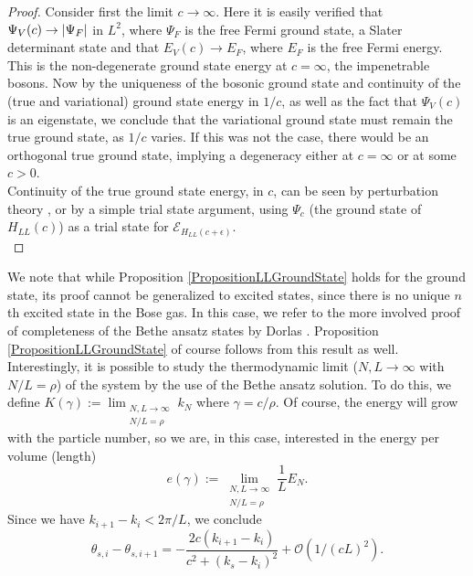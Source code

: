 \begin{proof}[Proof]
	Consider first the limit $ c\to \infty $. Here it is easily verified that $\Psi_V(c)\to \left\lvert \Psi_F \right\rvert$ in $ L^2 $, where $ \Psi_F $ is the free Fermi ground state, \ie a Slater determinant state and that $ E_V(c)\to E_F $, where $ E_F $ is the free Fermi energy. This is the non-degenerate ground state energy at $ c=\infty $, \ie the impenetrable bosons. Now by the uniqueness of the bosonic ground state and continuity of the (true and variational) ground state energy in $ 1/c $, as well as the fact that $ \Psi_V(c) $ is an eigenstate, we conclude that the variational ground state must remain the true ground state, as $ 1/c $ varies. If this was not the case, there would be an orthogonal true ground state, implying a degeneracy either at $ c=\infty $ or at some $ c>0 $. \\
	Continuity of the true ground state energy, in $ c $, can be seen by perturbation theory \cite{reed1978iv}, or by a simple trial state argument, using $ \Psi_c $ (the ground state of $ H_{LL}(c) $) as a trial state for $ \mathcal{E}_{H_{LL}(c+\epsilon)} $.\\
\end{proof}
We note that while Proposition \ref{PropositionLLGroundState} holds for the ground state, its proof cannot be generalized to excited states, since there is no unique $ n $th excited state in the Bose gas. In this case, we refer to the more involved proof of completeness of the Bethe ansatz states by Dorlas \cite{cmp/1104252974}. Proposition \ref{PropositionLLGroundState} of course follows from this result as well.\\
Interestingly, it is possible to study the thermodynamic limit ($ N,L\to\infty $ with $ N/L=\rho $) of the system by the use of the Bethe ansatz solution. To do this, we define $ K(\gamma):=\lim_{\substack{N,L\to\infty\\
		N/L=\rho}}k_N $ where $ \gamma=c/\rho $. Of course, the energy will grow with the particle number, so we are, in this case, interested in the energy per volume (length)
\begin{equation}\label{}
e(\gamma):=\lim_{\substack{N,L\to\infty\\
N/L=\rho}} \frac{1}{L}E_N.
\end{equation}
Since we have $ k_{i+1}-k_i<2\pi/L $, we conclude\begin{equation}
\theta_{s,i}-\theta_{s,i+1}=-\frac{2c(k_{i+1}-k_i)}{c^2+(k_s-k_i)^2}+\mathcal{O}(1/(cL)^2).
\end{equation}
